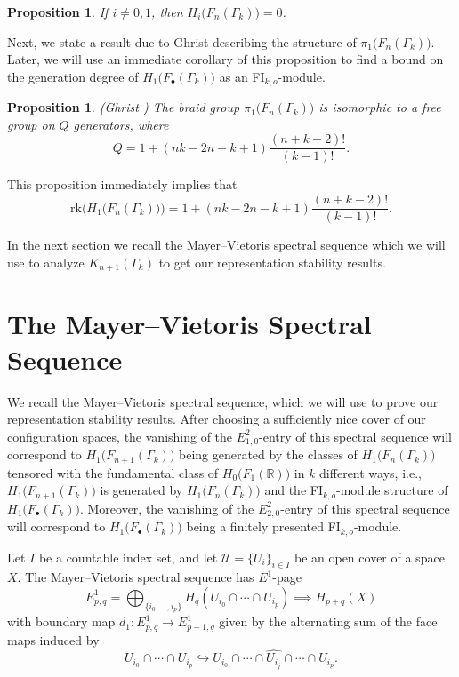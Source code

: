 \documentclass[pagebackref,colorlinks,citecolor=blue,linkcolor=blue,urlcolor=blue,filecolor=blue]{article}
\newtheorem{prop}[thm]{Proposition}
\theoremstyle{definition}\newtheorem{definition}[thm]{Definition}
\theoremstyle{definition}
\newcommand{\R}{\ensuremath{\mathbb{R}}}
\begin{document}
\begin{prop}\label{only homology in degree 0,1}
If $i\neq 0, 1$, then $H_{i}\big(F_{n}(\Gamma_{k})\big)=0$.
\end{prop}

Next, we state a result due to Ghrist \cite{Ghr01} describing the structure of $\pi_{1}\big(F_{n}(\Gamma_{k})\big)$.
Later, we will use an immediate corollary of this proposition to find a bound on the generation degree of $H_{1}\big(F_{\bullet}(\Gamma_{k})\big)$ as an FI$_{k,o}$-module.

\begin{prop}\label{pi1 of conf}
(Ghrist \cite[Proposition 4.1]{Ghr01})
The braid group $\pi_{1}\big(F_{n}(\Gamma_{k})\big)$ is isomorphic to a free group on $Q$ generators, where
\[
Q=1+(nk-2n-k+1)\frac{(n+k-2)!}{(k-1)!}.
\]
\end{prop}

This proposition immediately implies that
\[
\text{rk}\Big(H_{1}\big(F_{n}(\Gamma_{k})\big)\Big)=1+(nk-2n-k+1)\frac{(n+k-2)!}{(k-1)!}.
\]

In the next section we recall the Mayer--Vietoris spectral sequence which we will use to analyze $K_{n+1}(\Gamma_{k})$ to get our representation stability results.

\section{The Mayer--Vietoris Spectral Sequence}\label{mayer vietoris}

We recall the Mayer--Vietoris spectral sequence, which we will use to prove our representation stability results.
After choosing a sufficiently nice cover of our configuration spaces, the vanishing of the $E^{2}_{1,0}$-entry of this spectral sequence will correspond to $H_{1}\big(F_{n+1}(\Gamma_{k})\big)$ being generated by the classes of $H_{1}\big(F_{n}(\Gamma_{k})\big)$ tensored with the fundamental class of $H_{0}\big(F_{1}(\R)\big)$ in $k$ different ways, i.e., $H_{1}\big(F_{n+1}(\Gamma_{k})\big)$ is generated by $H_{1}\big(F_{n}(\Gamma_{k})\big)$ and the FI$_{k,o}$-module structure of $H_{1}\big(F_{\bullet}(\Gamma_{k})\big)$.
Moreover, the vanishing of the $E^{2}_{2,0}$-entry of this spectral sequence will correspond to $H_{1}\big(F_{\bullet}(\Gamma_{k})\big)$ being a finitely presented FI$_{k,o}$-module.

Let $I$ be a countable index set, and let $\mathcal{U}=\{U_{i}\}_{i\in I}$ be an open cover of a space $X$.
The Mayer--Vietoris spectral sequence has $E^{1}$-page
\[
E^{1}_{p,q}=\bigoplus_{\{i_{0}, \dots, i_{p}\}}H_{q}(U_{i_{0}}\cap\cdots\cap U_{i_{p}})\implies H_{p+q}(X)
\]
with boundary map $d_{1}:E^{1}_{p,q}\to E^{1}_{p-1, q}$ given by the alternating sum of the face maps induced by
\[
U_{i_{0}}\cap\cdots\cap U_{i_{p}}\hookrightarrow U_{i_{0}}\cap\cdots\cap \widehat{U_{i_{j}}}\cap\cdots\cap U_{i_{p}}.
\]
\end{document}

